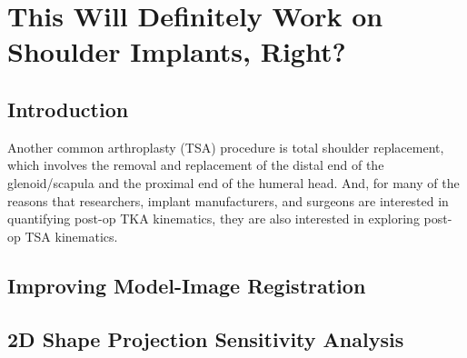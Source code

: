  \chapter{This Will Definitely Work on Shoulder Implants, Right?}

\section{Introduction}
Another common arthroplasty (TSA) procedure is total shoulder replacement, which involves the removal and replacement of the distal end of the glenoid/scapula and the proximal end of the humeral head.
And, for many of the reasons that researchers, implant manufacturers, and surgeons are interested in quantifying post-op TKA kinematics, they are also interested in exploring post-op TSA kinematics.
\section{Improving Model-Image Registration}

\section{2D Shape Projection Sensitivity Analysis}



